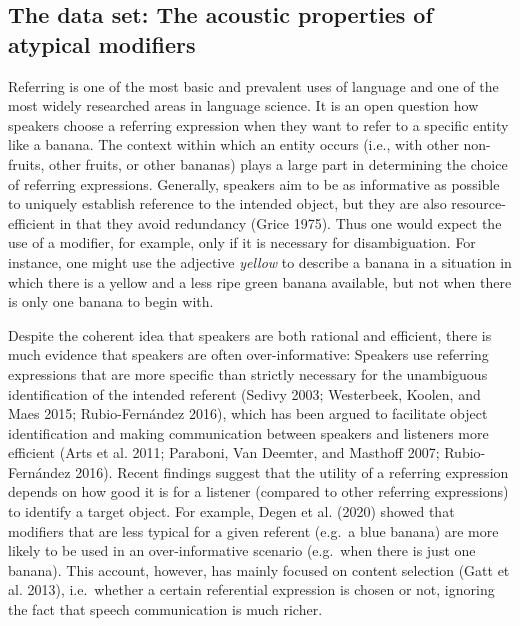 \documentclass[
  12pt,
]{article}
\begin{document}
\hypertarget{the-data-set-the-acoustic-properties-of-atypical-modifiers}{%
\subsection{The data set: The acoustic properties of atypical modifiers}\label{the-data-set-the-acoustic-properties-of-atypical-modifiers}}

Referring is one of the most basic and prevalent uses of language and one of the most widely researched areas in language science.
It is an open question how speakers choose a referring expression when they want to refer to a specific entity like a banana.
The context within which an entity occurs (i.e., with other non-fruits, other fruits, or other bananas) plays a large part in determining the choice of referring expressions.
Generally, speakers aim to be as informative as possible to uniquely establish reference to the intended object, but they are also resource-efficient in that they avoid redundancy (Grice 1975).
Thus one would expect the use of a modifier, for example, only if it is necessary for disambiguation.
For instance, one might use the adjective \emph{yellow} to describe a banana in a situation in which there is a yellow and a less ripe green banana available, but not when there is only one banana to begin with.

Despite the coherent idea that speakers are both rational and efficient, there is much evidence that speakers are often over-informative: Speakers use referring expressions that are more specific than strictly necessary for the unambiguous identification of the intended referent (Sedivy 2003; Westerbeek, Koolen, and Maes 2015; Rubio-Fernández 2016), which has been argued to facilitate object identification and making communication between speakers and listeners more efficient (Arts et al. 2011; Paraboni, Van Deemter, and Masthoff 2007; Rubio-Fernández 2016).
Recent findings suggest that the utility of a referring expression depends on how good it is for a listener (compared to other referring expressions) to identify a target object.
For example, Degen et al. (2020) showed that modifiers that are less typical for a given referent (e.g.~a blue banana) are more likely to be used in an over-informative scenario (e.g.~when there is just one banana).
This account, however, has mainly focused on content selection (Gatt et al. 2013), i.e.~whether a certain referential expression is chosen or not, ignoring the fact that speech communication is much richer.
\end{document}
